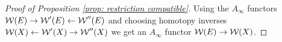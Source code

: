 \documentclass{article}
\theoremstyle{plain}%
\theoremstyle{definition}
\newtheorem{rem}[thm]{Remark}
\numberwithin{equation}{section}
\numberwithin{figure}{section}
\def\eq{\eqref}
\def\cW{{\mathbin{\cal W}}}
\def\iy{\infty}
\begin{document}
\begin{proof}[Proof of Proposition \ref{prop: restriction compatible}]

  Using the $A_\iy$ functors $\cW(E)\to\cW'(E) \leftarrow \cW''(E)$ and choosing homotopy inverses $\cW(X) \leftarrow \cW'(X)\to\cW''(X)$ we get an $A_\iy$ functor $\cW(E)\to\cW(X)$. %
\end{proof}

\end{document}
